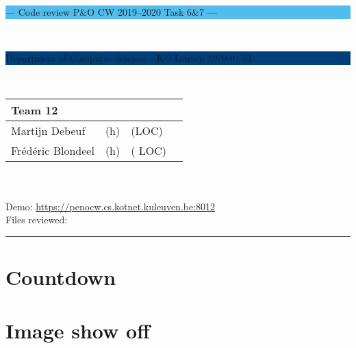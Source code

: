 \documentclass[a4paper,11pt]{article}
\begin{document}
\noindent
\colorbox[HTML]{52BDEC}{\bfseries\parbox{\textwidth}{\centering\large
  --- Code review P\&O CW 2019--2020 Task 6\&7 ---
}}
\\[-1mm]
\colorbox[HTML]{00407A}{\bfseries\color{white}\parbox{\textwidth}{
  Department of Computer Science -- KU Leuven
  \hfill
  \today
}}
\\

\smallskip

\noindent
\begin{tabular}{*4l}
\toprule
\multicolumn{3}{l}{\large\textbf{Team 12}} \\
\midrule
Martijn Debeuf & (h) &  (LOC) \\ %
Frédéric Blondeel & (h) & ( LOC) \\
\bottomrule
\hline
\end{tabular}\\
\\
Demo: \url{https://penocw.cs.kotnet.kuleuven.be:8012} \\
Files reviewed: 

\noindent
{\color[HTML]{52BDEC} \rule{\linewidth}{1mm} }

\smallskip

\section{Countdown}


\section{Image show off}
\end{document}
